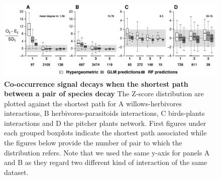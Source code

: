 \begin{figure}
\centering
\includegraphics{chapitre3/figOrder.pdf}
\caption{\textbf{Co-occurrence signal decays when the shortest path
between a pair of species decay} The Z-score distribution are plotted
against the shortest path for A willows-herbivores interactions, B
herbivores-parasitoids interactions, C birds-plants interactions and D
the pitcher plants network. First figures under each grouped boxplots
indicate the shortest path associated while the figures below provide
the number of pair to which the distribution refers. Note that we used
the same y-axis for panels A and B as they regard two different kind of
interaction of the same dataset.\label{fig:shtpth}}
\end{figure}

\newpage

